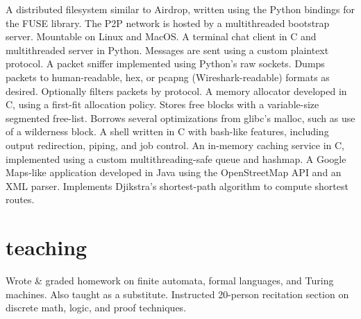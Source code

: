 \documentclass{cv}
\begin{document}
\begin{entrylist}
    {A distributed filesystem similar to Airdrop, written using the Python bindings for the FUSE library. The P2P network is hosted by a multithreaded bootstrap server. Mountable on Linux and MacOS.}
    {A terminal chat client in C and multithreaded server in Python. Messages are sent using a custom plaintext protocol.}
    {A packet sniffer implemented using Python's raw sockets. Dumps packets to human-readable, hex, or pcapng (Wireshark-readable) formats as desired. Optionally filters packets by protocol.}
    {A memory allocator developed in C, using a first-fit allocation policy. Stores free blocks with a variable-size segmented free-list. Borrows several optimizations from glibc's malloc, such as use of a wilderness block.}
    {A shell written in C with bash-like features, including output redirection, piping, and job control.}
    {An in-memory caching service in C, implemented using a custom multithreading-safe queue and hashmap.}
    {A Google Maps-like application developed in Java using the OpenStreetMap API and an XML parser. Implements Djikstra's shortest-path algorithm to compute shortest routes.}
\end{entrylist}

\section{teaching}

\begin{entrylist}
    {Wrote \& graded homework on finite automata, formal languages, and Turing machines. Also taught as a substitute.}
    {Instructed 20-person recitation section on discrete math, logic, and proof techniques.}
\end{entrylist}
\end{document}
